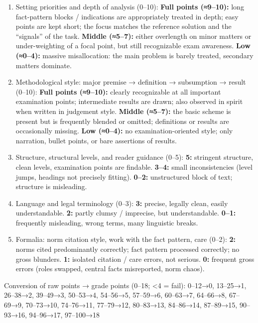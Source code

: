 \documentclass[11pt]{article}
\begin{document}
\begin{enumerate}
  predominantly definitions without application; results are unreasoned
  or contradictory.
\item
  Setting priorities and depth of analysis (0--10): \textbf{Full points
  (≈9--10):} long fact-pattern blocks / indications are appropriately
  treated in depth; easy points are kept short; the focus matches the
  reference solution and the ``signals'' of the task. \textbf{Middle
  (≈5--7):} either overlength on minor matters or under-weighting of a
  focal point, but still recognizable exam awareness. \textbf{Low
  (≈0--4):} massive misallocation: the main problem is barely treated,
  secondary matters dominate.
\item
  Methodological style: major premise → definition → subsumption →
  result (0--10): \textbf{Full points (≈9--10):} clearly recognizable at
  all important examination points; intermediate results are drawn; also
  observed in spirit when written in judgement style. \textbf{Middle
  (≈5--7):} the basic scheme is present but is frequently blended or
  omitted; definitions or results are occasionally missing. \textbf{Low
  (≈0--4):} no examination-oriented style; only narration, bullet
  points, or bare assertions of results.
\item
  Structure, structural levels, and reader guidance (0--5): \textbf{5:}
  stringent structure, clean levels, examination points are findable.
  \textbf{3--4:} small inconsistencies (level jumps, headings not
  precisely fitting). \textbf{0--2:} unstructured block of text;
  structure is misleading.
\item
  Language and legal terminology (0--3): \textbf{3:} precise, legally
  clean, easily understandable. \textbf{2:} partly clumsy / imprecise,
  but understandable. \textbf{0--1:} frequently misleading, wrong terms,
  many linguistic breaks.
\item
  Formalia: norm citation style, work with the fact pattern, care
  (0--2): \textbf{2:} norms cited predominantly correctly; fact pattern
  processed correctly; no gross blunders. \textbf{1:} isolated citation
  / care errors, not serious. \textbf{0:} frequent gross errors (roles
  swapped, central facts misreported, norm chaos).
\end{enumerate}

Conversion of raw points → grade points (0--18; \textless4 = fail):
0--12→0, 13--25→1, 26--38→2, 39--49→3, 50--53→4, 54--56→5, 57--59→6,
60--63→7, 64--66→8, 67--69→9, 70--73→10, 74--76→11, 77--79→12,
80--83→13, 84--86→14, 87--89→15, 90--93→16, 94--96→17, 97--100→18
\end{document}
